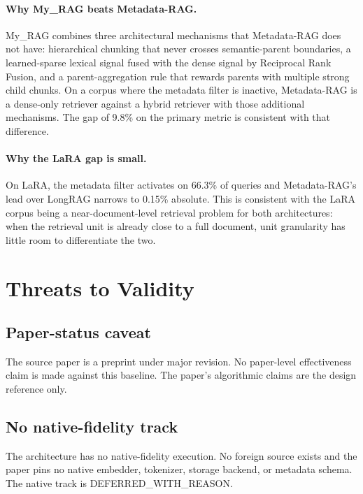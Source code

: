 \documentclass[11pt,a4paper]{article}
\begin{document}
\paragraph{Why My\_RAG beats Metadata-RAG.}
My\_RAG combines three architectural mechanisms that Metadata-RAG
does not have: hierarchical chunking that never crosses
semantic-parent boundaries, a learned-sparse lexical signal fused
with the dense signal by Reciprocal Rank Fusion, and a
parent-aggregation rule that rewards parents with multiple strong
child chunks. On a corpus where the metadata filter is inactive,
Metadata-RAG is a dense-only retriever against a hybrid retriever
with those additional mechanisms. The gap of \num{9.8}\% on the
primary metric is consistent with that difference.

\paragraph{Why the LaRA gap is small.}
On LaRA, the metadata filter activates on \num{66.3}\% of queries
and Metadata-RAG's lead over LongRAG narrows to \num{0.15}\%
absolute. This is consistent with the LaRA corpus being a
near-document-level retrieval problem for both architectures: when
the retrieval unit is already close to a full document, unit
granularity has little room to differentiate the two.

\section{Threats to Validity}\label{sec:threats}

\subsection{Paper-status caveat}
The source paper is a preprint under major revision. No paper-level
effectiveness claim is made against this baseline. The paper's
algorithmic claims are the design reference only.

\subsection{No native-fidelity track}
The architecture has no native-fidelity execution. No foreign source
exists and the paper pins no native embedder, tokenizer, storage
backend, or metadata schema. The native track is
\textsc{DEFERRED\_WITH\_REASON}.
\end{document}
